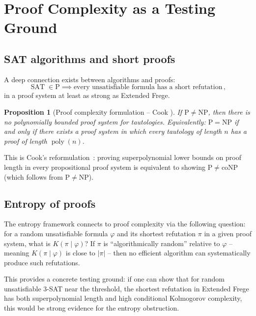 \documentclass[aps,prd,twocolumn,superscriptaddress,nofootinbib]{revtex4-2}
\newtheorem{proposition}[theorem]{Proposition}
\theoremstyle{definition}
\theoremstyle{remark}
\DeclareMathOperator{\poly}{poly}
\DeclareMathOperator{\SAT}{SAT}
\newcommand{\NP}{\mathrm{NP}}
\newcommand{\PP}{\mathrm{P}}
\newcommand{\coNP}{\mathrm{coNP}}
\begin{document}
\section{Proof Complexity as a Testing Ground}
\label{sec:proof_complexity}

\subsection{SAT algorithms and short proofs}

A deep connection exists between algorithms and proofs:
\begin{equation}
\SAT \in \PP \implies \text{every unsatisfiable formula has a short refutation}\,,
\end{equation}
in a proof system at least as strong as Extended Frege.

\begin{proposition}[Proof complexity formulation -- Cook {\cite{Cook1975}}]
\label{prop:proof_complexity}
If $\PP \neq \NP$, then there is no polynomially bounded proof system for tautologies. Equivalently: $\PP = \NP$ if and only if there exists a proof system in which every tautology of length $n$ has a proof of length $\poly(n)$.
\end{proposition}

This is Cook's reformulation~\cite{Cook1975}: proving superpolynomial lower bounds on proof length in every propositional proof system is equivalent to showing $\PP \neq \coNP$ (which follows from $\PP \neq \NP$).

\subsection{Entropy of proofs}

The entropy framework connects to proof complexity via the following question: for a random unsatisfiable formula $\varphi$ and its shortest refutation $\pi$ in a given proof system, what is $K(\pi \mid \varphi)$? If $\pi$ is ``algorithmically random'' relative to $\varphi$ -- meaning $K(\pi \mid \varphi)$ is close to $|\pi|$ -- then no efficient algorithm can systematically produce such refutations.

This provides a concrete testing ground: if one can show that for random unsatisfiable $3$-SAT near the threshold, the shortest refutation in Extended Frege has both superpolynomial length and high conditional Kolmogorov complexity, this would be strong evidence for the entropy obstruction.
\end{document}
